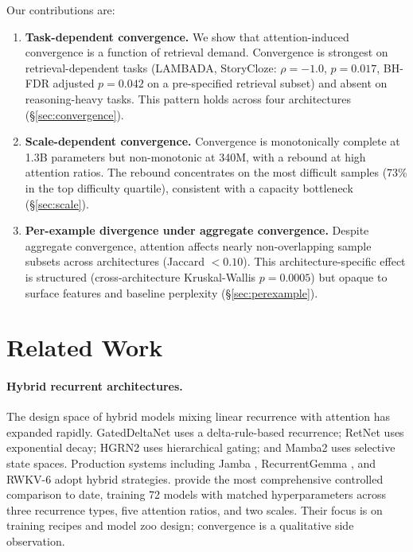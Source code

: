 \documentclass[11pt]{article}
\begin{document}
Our contributions are:
\begin{enumerate}
\item \textbf{Task-dependent convergence.} We show that attention-induced convergence is a function of retrieval demand. Convergence is strongest on retrieval-dependent tasks (LAMBADA, StoryCloze: $\rho = {-}1.0$, $p = 0.017$, BH-FDR adjusted $p = 0.042$ on a pre-specified retrieval subset) and absent on reasoning-heavy tasks. This pattern holds across four architectures (\S\ref{sec:convergence}).
\item \textbf{Scale-dependent convergence.} Convergence is monotonically complete at 1.3B parameters but non-monotonic at 340M, with a rebound at high attention ratios. The rebound concentrates on the most difficult samples (73\% in the top difficulty quartile), consistent with a capacity bottleneck (\S\ref{sec:scale}).
\item \textbf{Per-example divergence under aggregate convergence.} Despite aggregate convergence, attention affects nearly non-overlapping sample subsets across architectures (Jaccard $< 0.10$). This architecture-specific effect is structured (cross-architecture Kruskal-Wallis $p = 0.0005$) but opaque to surface features and baseline perplexity (\S\ref{sec:perexample}).
\end{enumerate}

\section{Related Work}

\paragraph{Hybrid recurrent architectures.}
The design space of hybrid models mixing linear recurrence with attention has expanded rapidly.
GatedDeltaNet \citep{yang2024gdn} uses a delta-rule-based recurrence; RetNet \citep{sun2023retnet} uses exponential decay; HGRN2 \citep{qin2024hgrn2} uses hierarchical gating; and Mamba2 \citep{dao2024mamba2} uses selective state spaces.
Production systems including Jamba \citep{lieber2024jamba}, RecurrentGemma \citep{botev2024recurrentgemma}, and RWKV-6 \citep{peng2024rwkv} adopt hybrid strategies.
\citet{wang2025zoo} provide the most comprehensive controlled comparison to date, training 72 models with matched hyperparameters across three recurrence types, five attention ratios, and two scales.
Their focus is on training recipes and model zoo design; convergence is a qualitative side observation.
\end{document}
